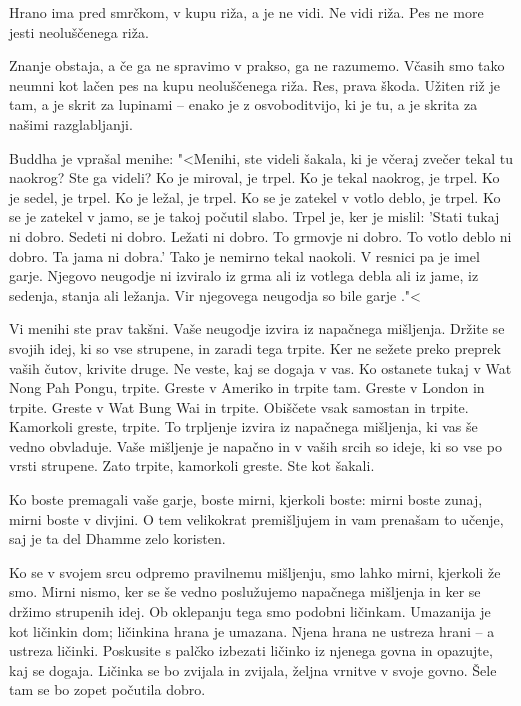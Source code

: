 Hrano ima pred smrčkom, v kupu riža, a je ne vidi. Ne vidi riža. Pes ne more jesti neoluščenega riža.

Znanje obstaja, a če ga ne spravimo v prakso, ga ne razumemo. Včasih smo tako neumni kot lačen pes na kupu neoluščenega riža. Res, prava škoda. Užiten riž je tam, a je skrit za lupinami – enako je z osvoboditvijo, ki je tu, a je skrita za našimi razglabljanji.

\clearpage


Buddha je vprašal menihe: "<Menihi, ste videli šakala, ki je včeraj zvečer tekal tu naokrog? Ste ga videli? Ko je miroval, je trpel. Ko je tekal naokrog, je trpel. Ko je sedel, je trpel. Ko je ležal, je trpel. Ko se je zatekel v votlo deblo, je trpel. Ko se je zatekel v jamo, se je takoj počutil slabo. Trpel je, ker je mislil: 'Stati tukaj ni dobro. Sedeti ni dobro. Ležati ni dobro. To grmovje ni dobro. To votlo deblo ni dobro. Ta jama ni dobra.' Tako je nemirno tekal naokoli. V resnici pa je imel garje. Njegovo neugodje ni izviralo iz grma ali iz votlega debla ali iz jame, iz sedenja, stanja ali ležanja. Vir njegovega neugodja so bile garje ."<

Vi menihi ste prav takšni. Vaše neugodje izvira iz napačnega mišljenja. Držite se svojih idej, ki so vse strupene, in zaradi tega trpite. Ker ne sežete preko preprek vaših čutov, krivite druge. Ne veste, kaj se dogaja v vas. Ko ostanete tukaj v Wat Nong Pah Pongu, trpite. Greste v Ameriko in trpite tam. Greste v London in trpite. Greste v Wat Bung Wai in trpite. Obiščete vsak samostan in trpite. Kamorkoli greste, trpite. To trpljenje izvira iz napačnega mišljenja, ki vas še vedno obvladuje. Vaše mišljenje je napačno in v vaših srcih so ideje, ki so vse po vrsti strupene. Zato trpite, kamorkoli greste. Ste kot šakali.

Ko boste premagali vaše garje, boste mirni, kjerkoli boste: mirni boste zunaj, mirni boste v divjini. O tem velikokrat premišljujem in vam prenašam to učenje, saj je ta del Dhamme zelo koristen.

\enlargethispage{\baselineskip}

\clearpage


Ko se v svojem srcu odpremo pravilnemu mišljenju, smo lahko mirni, kjerkoli že smo. Mirni nismo, ker se še vedno poslužujemo napačnega mišljenja in ker se držimo strupenih idej. Ob oklepanju tega smo podobni ličinkam. Umazanija je kot ličinkin dom; ličinkina hrana je umazana. Njena hrana ne ustreza hrani – a ustreza ličinki. Poskusite s palčko izbezati ličinko iz njenega govna in opazujte, kaj se dogaja. Ličinka se bo zvijala in zvijala, željna vrnitve v svoje govno. Šele tam se bo zopet počutila dobro.

